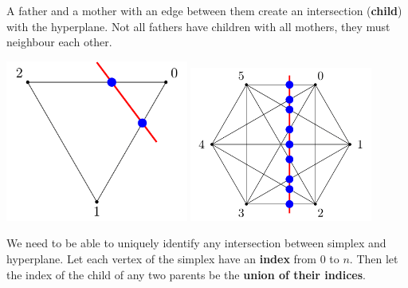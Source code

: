 \documentclass[a0paper,landscape,final]{baposter}
\begin{document}
\begin{poster}
{A father and a mother with an edge between them create an intersection (\textbf{child}) with the hyperplane.
Not all fathers have children with all mothers, they must neighbour each other.
\begin{center}
	\includegraphics[width=0.45\textwidth]{FIG/TIKZ_SimplexFlat_20230415/TIKZ_SimplexFlat_20230415-3.png}
	\includegraphics[width=0.45\textwidth]{FIG/TIKZ_SimplexFlat_20230415/TIKZ_SimplexFlat_20230415-6.png}
\end{center}
We need to be able to uniquely identify any intersection between simplex and hyperplane.
Let each vertex of the simplex have an \textbf{index} from 0 to $n$.
Then let the index of the child of any two parents be the \textbf{union of their indices}.
}



\end{poster}
\end{document}
